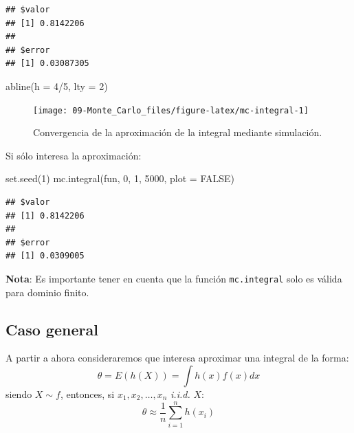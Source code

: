 \documentclass[
]{book}
\newenvironment{Shaded}{\begin{snugshade}}{\end{snugshade}}
\newcommand{\AttributeTok}[1]{\textcolor[rgb]{0.77,0.63,0.00}{#1}}
\newcommand{\ConstantTok}[1]{\textcolor[rgb]{0.00,0.00,0.00}{#1}}
\newcommand{\DecValTok}[1]{\textcolor[rgb]{0.00,0.00,0.81}{#1}}
\newcommand{\FunctionTok}[1]{\textcolor[rgb]{0.00,0.00,0.00}{#1}}
\newcommand{\NormalTok}[1]{#1}
\newcommand{\SpecialCharTok}[1]{\textcolor[rgb]{0.00,0.00,0.00}{#1}}
\theoremstyle{break}
\theoremstyle{definition}
\theoremstyle{definition}
\theoremstyle{definition}
\theoremstyle{definition}
\theoremstyle{remark}
\begin{document}
\begin{verbatim}
## $valor
## [1] 0.8142206
## 
## $error
## [1] 0.03087305
\end{verbatim}

\begin{Shaded}
\begin{Highlighting}[]
\FunctionTok{abline}\NormalTok{(}\AttributeTok{h =} \DecValTok{4}\SpecialCharTok{/}\DecValTok{5}\NormalTok{, }\AttributeTok{lty =} \DecValTok{2}\NormalTok{)}
\end{Highlighting}
\end{Shaded}

\begin{figure}[!htb]

{\centering \texttt{[image: 09-Monte\_Carlo\_files/figure-latex/mc-integral-1]} 

}

\caption{Convergencia de la aproximación de la integral mediante simulación.}\label{fig:mc-integral}
\end{figure}

Si sólo interesa la aproximación:

\begin{Shaded}
\begin{Highlighting}[]
\FunctionTok{set.seed}\NormalTok{(}\DecValTok{1}\NormalTok{)}
\FunctionTok{mc.integral}\NormalTok{(fun, }\DecValTok{0}\NormalTok{, }\DecValTok{1}\NormalTok{, }\DecValTok{5000}\NormalTok{, }\AttributeTok{plot =} \ConstantTok{FALSE}\NormalTok{)}
\end{Highlighting}
\end{Shaded}

\begin{verbatim}
## $valor
## [1] 0.8142206
## 
## $error
## [1] 0.0309005
\end{verbatim}

\textbf{Nota}: Es importante tener en cuenta que la función \texttt{mc.integral} solo es válida para dominio finito.

\hypertarget{caso-general}{%
\subsection{Caso general}\label{caso-general}}

A partir a ahora consideraremos que interesa aproximar una integral de la forma:
\[\theta = E\left( h\left( X\right) \right) = \int h\left( x\right) f(x)dx\]siendo
\(X\sim f\), entonces, si \(x_1,x_2,\ldots ,x_n\) \emph{i.i.d.}
\(X\):
\[\theta \approx \frac{1}{n}\sum\limits_{i=1}^nh\left( x_i\right)\]
\end{document}

